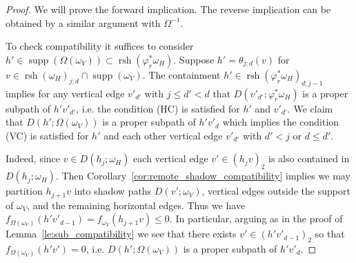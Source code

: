 \documentclass{amsart}
\newcommand{\supp}{\operatorname{supp}}
\newcommand{\rsh}{\operatorname{rsh}}
\begin{document}
 \begin{proof}
  We will prove the forward implication.  The reverse implication can be obtained by a similar argument with $\Omega^{-1}$.
  
  To check compatibility it suffices to consider $h'\in\supp(\Omega(\omega_V))\subset\rsh(\varphi_r^*\omega_H)$.  Suppose $h'=\theta_{j;d}(v)$ for $v\in\rsh(\omega_H)_{j;d}\cap\supp(\omega_V)$.  The containment $h'\in\rsh(\varphi_r^*\omega_H)_{d;j-1}$ implies for any vertical edge $v'_{d'}$ with $j\le d'<d$ that $D(v'_{d'};\varphi_r^*\omega_H)$ is a proper subpath of $h'v'_{d'}$, i.e. the condition (HC) is satisfied for $h'$ and $v'_{d'}$.  We claim that $D(h';\Omega(\omega_V))$ is a proper subpath of $h'v'_d$ which implies the condition (VC) is satisfied for $h'$ and each other vertical edge $v'_{d'}$ with $d'<j$ or $d\le d'$.  

  Indeed, since $v\in D(h_j;\omega_H)$ each vertical edge $v'\in(h_jv)_2$ is also contained in $D(h_j;\omega_H)$.  Then Corollary~\ref{cor:remote_shadow_compatibility} implies we may partition $h_{j+1}v$ into shadow paths $D(v';\omega_V)$, vertical edges outside the support of $\omega_V$, and the remaining horizontal edges.  Thus we have $f_{\Omega(\omega_V)}(h'v'_{d-1})=f_{\omega_V}(h_{j+1}v)\le0$.  In particular, arguing as in the proof of Lemma~\ref{le:sub_compatibility} we see that there exists $v'\in(h'v'_{d-1})_2$ so that $f_{\Omega(\omega_V)}(h'v')=0$, i.e. $D(h';\Omega(\omega_V))$ is a proper subpath of $h'v'_d$.
 \end{proof}
\end{document}

